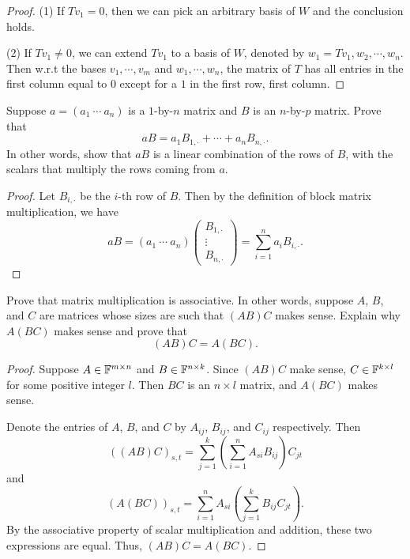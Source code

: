\documentclass{article}
\begin{document}
\begin{proof}
    (1) If \( Tv_1=0 \), then we can pick an arbitrary basis of \( W \) and the conclusion holds. \par
    (2) If \( Tv_1\ne 0 \), we can extend \( Tv_1 \) to a basis of \( W \), denoted by \( w_1=Tv_1,w_2,\cdots,w_n \). Then w.r.t the bases \( v_1,\cdots,v_m \) and \( w_1,\cdots,w_n \), the matrix of \( T  \) has all entries in the first column equal to \( 0 \) except for a \( 1 \) in the first row, first column.
\end{proof}

\begin{problem}[3C-9]
    Suppose \( a=(a_1\ \cdots\ a_n) \) is a \(1\)-by-\(n\) matrix and \( B \) is an \(n\)-by-\(p\)
    matrix. Prove that
    \[
        aB=a_1B_{1,\cdot}+\cdots+a_nB_{n,\cdot}.
    \]
    In other words, show that \( aB \) is a linear combination of the rows of \( B \), with the
    scalars that multiply the rows coming from \( a \).
\end{problem}

\begin{proof}
    Let \( B_{i,\cdot} \) be the \( i \)-th row of \( B \). Then by the definition of block matrix multiplication, we have
    \[
        aB=(a_1\ \cdots\ a_n)\left(\begin{matrix}
            B_{1,\cdot}\\
            \vdots\\
            B_{n,\cdot}
        \end{matrix}\right)=\sum_{i=1}^n a_i B_{i,\cdot}.
    \]
\end{proof}

\begin{problem}[3C-12]
    Prove that matrix multiplication is associative. In other words, suppose \( A \), \( B \), and \( C \) are matrices whose sizes are such that \( (AB)C \) makes sense. Explain why
    \( A(BC) \) makes sense and prove that
    \[
        (AB)C=A(BC).
    \]
\end{problem}

\begin{proof}
    Suppose \( A\in\mathbb{F}^{m\times n } \) and \( B\in\mathbb{F}^{n\times k} \). Since \( (AB)C  \) make sense, \( C\in\mathbb{F}^{k\times l } \) for some positive integer \( l \). Then \( BC \) is an \( n \times l \) matrix, and \( A(BC) \) makes sense. \par
    Denote the entries of \( A \), \( B \), and \( C \) by \( A_{ij} \), \( B_{ij} \), and \( C_{ij} \) respectively. Then
    \[ ((AB)C)_{s,t}=\sum_{j=1}^{k}\left(\sum_{i=1}^{n} A_{si}B_{ij}\right)C_{jt} \]
    and
    \[ (A(BC))_{s,t}=\sum_{i=1}^{n} A_{si}\left(\sum_{j=1}^{k} B_{ij}C_{jt}\right). \]
    By the associative property of scalar multiplication and addition, these two expressions are equal. Thus, \( (AB)C=A(BC) \).
\end{proof}
\end{document}
